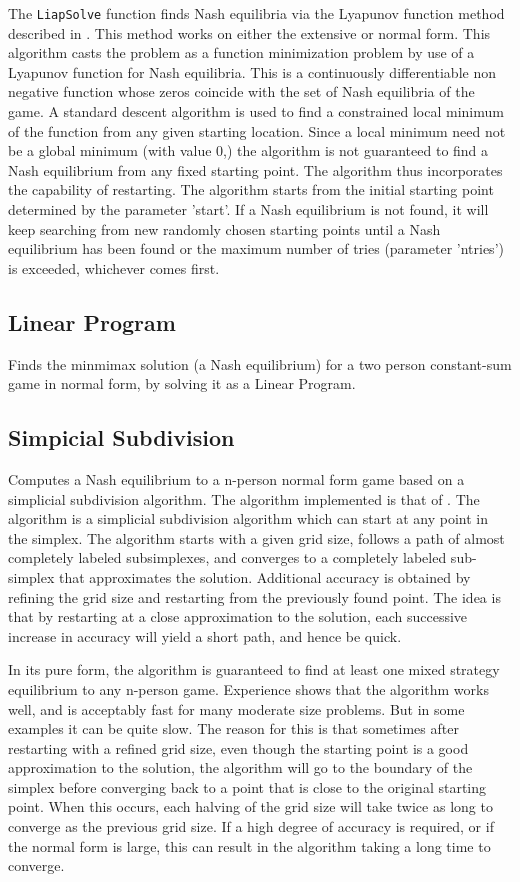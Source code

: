 The {\tt LiapSolve} function finds Nash equilibria via the Lyapunov
function method described in \cite{McK:91}.  This method works on
either the extensive or normal form.  This algorithm casts the problem
as a function minimization problem by use of a Lyapunov function for
Nash equilibria.  This is a continuously differentiable non negative
function whose zeros coincide with the set of Nash equilibria of the
game.  A standard descent algorithm is used to find a constrained
local minimum of the function from any given starting location.  Since
a local minimum need not be a global minimum (with value 0,) the
algorithm is not guaranteed to find a Nash equilibrium from any fixed
starting point.  The algorithm thus incorporates the capability of
restarting.  The algorithm starts from the initial starting point
determined by the parameter 'start'.  If a Nash equilibrium is not
found, it will keep searching from new randomly chosen starting points
until a Nash equilibrium has been found or the maximum number of tries
(parameter 'ntries') is exceeded, whichever comes first.

\subsection{Linear Program}

Finds the minmimax solution (a Nash equilibrium) for a two person
constant-sum game in normal form, by solving it as a Linear Program.

\subsection{Simpicial Subdivision}

Computes a Nash equilibrium to a n-person normal form game based on a
simplicial subdivision algorithm.  The algorithm implemented is that
of \cite{VTH:1987}.  The algorithm is a simplicial subdivision
algorithm which can start at any point in the simplex.  The algorithm
starts with a given grid size, follows a path of almost completely
labeled subsimplexes, and converges to a completely labeled
sub-simplex that approximates the solution.  Additional accuracy is
obtained by refining the grid size and restarting from the previously
found point.  The idea is that by restarting at a close approximation
to the solution, each successive increase in accuracy will yield a
short path, and hence be quick.

In its pure form, the algorithm is guaranteed to find at least one
mixed strategy equilibrium to any n-person game.  Experience shows
that the algorithm works well, and is acceptably fast for many
moderate size problems.  But in some examples it can be quite slow.
The reason for this is that sometimes after restarting with a refined
grid size, even though the starting point is a good approximation to
the solution, the algorithm will go to the boundary of the simplex
before converging back to a point that is close to the original
starting point.  When this occurs, each halving of the grid size will
take twice as long to converge as the previous grid size.  If a high
degree of accuracy is required, or if the normal form is large, this
can result in the algorithm taking a long time to converge.

